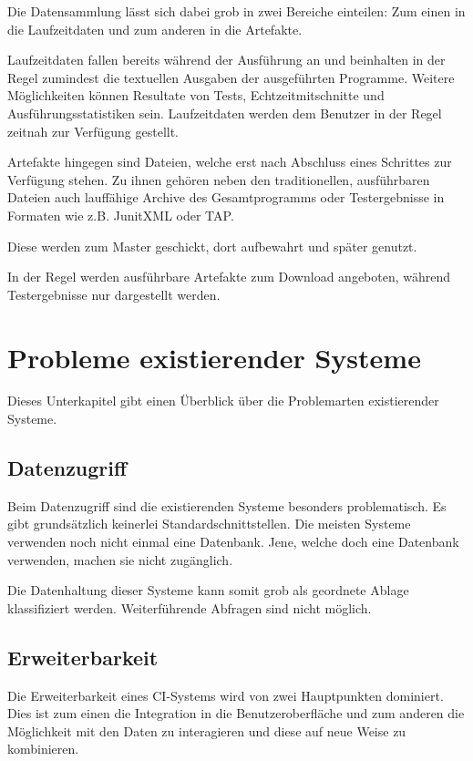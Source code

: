 Die Datensammlung lässt sich dabei grob in zwei Bereiche einteilen:
Zum einen in die Laufzeitdaten und zum anderen in die Artefakte.

Laufzeitdaten fallen bereits w\"ahrend der Ausf\"uhrung an
und beinhalten in der Regel zumindest die textuellen Ausgaben
der ausgef\"uhrten Programme.
Weitere M\"oglichkeiten k\"onnen Resultate von Tests, Echtzeitmitschnitte und Ausführungsstatistiken sein.
Laufzeitdaten werden dem Benutzer in der Regel zeitnah zur Verfügung gestellt.

Artefakte hingegen sind Dateien,
welche erst nach Abschluss eines Schrittes zur Verfügung stehen.
Zu ihnen geh\"oren neben den traditionellen, ausf\"uhrbaren Dateien
auch lauff\"ahige Archive des Gesamtprogramms oder Testergebnisse in Formaten wie z.B. JunitXML \cite{jenkins:junitxml} oder \ac{TAP}.


Diese werden zum Master geschickt, dort aufbewahrt und sp\"ater genutzt.

In der Regel werden ausf\"uhrbare Artefakte zum Download angeboten,
w\"ahrend Testergebnisse nur dargestellt werden.


\section{Probleme existierender Systeme}

Dieses Unterkapitel gibt einen \"Uberblick \"uber die Problemarten existierender Systeme.

\subsection{Datenzugriff}

Beim Datenzugriff sind die existierenden Systeme besonders problematisch.
Es gibt grundsätzlich keinerlei Standardschnittstellen.
Die meisten Systeme verwenden noch nicht einmal eine Datenbank.
Jene, welche doch eine Datenbank verwenden, machen sie nicht zugänglich.

Die Datenhaltung dieser Systeme kann somit grob als geordnete Ablage klassifiziert werden.
Weiterführende Abfragen sind nicht möglich.

\subsection{Erweiterbarkeit}

Die Erweiterbarkeit eines \ac{CI}-Systems wird von zwei Hauptpunkten dominiert.
Dies ist zum einen die Integration in die Benutzeroberfl\"ache
und zum anderen die Möglichkeit mit den Daten zu interagieren
und diese auf neue Weise zu kombinieren.

